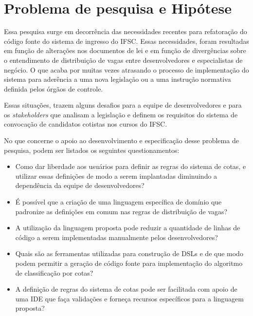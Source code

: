 \section{Problema de pesquisa e Hipótese}
\label{problema}

Essa pesquisa surge em decorrência das necessidades recentes para refatoração do código fonte do sistema de ingresso do \gls{IFSC}. Essas necessidades, foram resultadas em função de alterações nos documentos de lei e em função de  divergências sobre o entendimento de distribuição de vagas entre desenvolvedores e especialistas de negócio. O que acaba por muitas vezes atrasando o processo de implementação do sistema para aderência a uma nova legislação ou a uma instrução normativa definida pelos órgãos de controle.

Essas situações, trazem alguns desafios para a equipe de desenvolvedores e para os \textit{stakeholders} que analisam a legislação e definem os requisitos do sistema de convocação de candidatos cotistas nos cursos do \gls{IFSC}. 

No que concerne o apoio ao desenvolvimento e especificação desse problema de pesquisa, podem ser listados os seguintes questionamentos:

\begin{itemize}
    \item Como dar liberdade aos usuários para definir as regras do sistema de cotas, e utilizar essas definições de modo a serem implantadas diminuindo a dependência da equipe de  desenvolvedores?
    
    \item É possível que a criação de uma linguagem específica de domínio que padronize as definições em comum nas regras de distribuição de vagas?
    
    \item A utilização da linguagem proposta pode reduzir a quantidade de linhas de código a serem implementadas manualmente pelos desenvolvedores?
    
    \item Quais são as ferramentas utilizadas para construção de \gls{DSL}s e de que modo podem permitir a geração de código fonte para implementação do algoritmo de classificação por cotas?
    
    \item A definição de regras do sistema de cotas pode ser facilitada com apoio de uma \gls{IDE} que faça validações e forneça recursos específicos para a linguagem proposta?
    

    
\end{itemize}{}